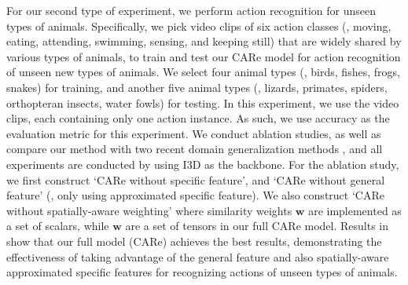 \documentclass[10pt,twocolumn,letterpaper]{article}
\begin{document}
    
    
    For our second type of experiment, we perform action recognition for unseen types of animals. Specifically, we  pick video clips of six action classes (\ie, moving, eating, attending, swimming, sensing, and keeping still) that are widely shared by various types of animals, to train and test our CARe model for action recognition of unseen new types of animals. We select four animal types (\ie, birds, fishes, frogs, snakes) for training, and another five animal types (\ie, lizards, primates, spiders, orthopteran insects, water fowls) for testing. In this experiment, we use the video clips, each containing only one action instance. As such, we use accuracy as the evaluation metric for this experiment. We conduct ablation studies, as well as compare our method with two recent domain generalization methods \cite{li2019episodic, wang2020heterogeneous}, and all experiments are conducted by using I3D as the backbone. For the ablation study, we first construct `CARe without specific feature', and `CARe without general feature' (\ie, only using approximated specific feature). We also construct `CARe without spatially-aware weighting' where similarity weights $\textbf{w}$ are implemented as a set of scalars, while $\textbf{w}$ are a set of tensors in our full CARe model. Results in  show that our full model (CARe) achieves the best results, demonstrating the effectiveness of taking advantage of the general feature and also spatially-aware approximated specific features for recognizing actions of unseen types of animals. 
    
    
    
    \begin{table}[t]
      \centering
      \caption{Results of action recognition of unseen animals}
      \label{table:ar_moe}
      \vspace{-0.3cm}
      \vspace{-0.4cm}
      
    \end{table}
    
\end{document}

